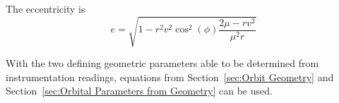 \documentclass[../basicOrbitalDynamics.tex]{subfiles}
\begin{document}
\bigskip
The eccentricity is
\[e=\sqrt{1-r^2v^2\cos^2(\phi)\frac{2\mu-rv^2}{\mu^2r}}\]

With the two defining geometric parameters able to be determined from instrumentation readings, equations from Section~\ref{sec:Orbit Geometry} and Section~\ref{sec:Orbital Parameters from Geometry} can be used.

\begin{comment}
\bigskip\bigskip
\subsection{Apsis Radii}
The radii of the apses (periapsis and apoapsis) can be found using a combination of conservation of energy and conservation of angular momentum. The angular momentum at any point is $h=rv_\theta$. Using this, an expression can be found for the radii of the apses (keeping in mind that at periapsis and apoapsis, the velocity is entirely along the horizontal with $\phi=0$).

Beginning with conservation of momentum,
\begin{align*}
    \st{h}{aps}             & = h        \\
    \st{r}{aps}\st{v}{aps} & =rv_\theta \\
\end{align*}
\begin{equation}\label{Apses Radius from h}
    \st{v}{aps}=\frac{rv_\theta}{\st{r}{aps}}
\end{equation}

Switching now to conservation of energy,
\begin{align*}
    \frac{1}{2}\st{v}{aps}^2-\frac{\mu}{\st{r}{aps}} & =\frac{1}{2}v^2-\frac{\mu}{r}                 \\
    \st{v}{aps}^2                                     & =v^2-\frac{2\mu}{r}+\frac{2\mu}{\st{r}{aps}} \\
\end{align*}
\begin{equation}\label{Apses Velocity from Radius}
    \st{v}{aps}=\sqrt{v^2-\frac{2\mu}{r}+\frac{2\mu}{\st{r}{aps}}}
\end{equation}

Setting \eqref{Apses Velocity from Radius} and \eqref{Apses Radius from h} equal to each other,
\begin{align*}
    \frac{rv_\theta}{\st{r}{aps}}       & = \sqrt{v^2-\frac{2\mu}{r}+\frac{2\mu}{\st{r}{aps}}}                            \\
    \frac{r^2v_\theta^2}{\st{r}{aps}^2} & = v^2-\frac{2\mu}{r}+\frac{2\mu}{\st{r}{aps}}                                   \\
    r^2v_\theta^2                        & = v^2\st{r}{aps}^2-\frac{2\mu}{r}\st{r}{aps}^2+2\mu{}\st{r}{aps}              \\
    0                                    & = \left(\frac{2\mu}{r}-v^2\right)\st{r}{aps}^2-2\mu{}\st{r}{aps}+r^2v_\theta^2 \\
\end{align*}


\end{comment}
\end{document}
